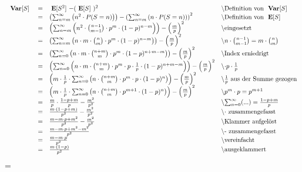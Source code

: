 \documentclass[twoside]{article}
\begin{document}
		\begin{equation*}
		    \begin{array}{rlll}
		        $\var{S}$&=&$\e{S^2}$-($\e{S}$)^2&$\textbackslash Definition von \var{S}$\\
		        &=&\left(\sum_{n=m}^{\infty}\left(n^2\cdot P(S=n)\right)\right)-\left(\sum_{n=m}^{\infty}\left(n\cdot P(S=n)\right)\right)^2&$\textbackslash Definition von \e{S}$\\
		        &=&\left(\sum_{n=m}^{\infty}\left(n^2\cdot\binom{n-1}{m-1}\cdot p^m\cdot (1-p)^{n-m}\right)\right)-\left(\frac{m}{p}\right)^2&$\textbackslash eingesetzt$\\
		        &=&\left(\sum_{n=m}^{\infty}\left(n\cdot m\cdot\binom{n}{m}\cdot p^m\cdot (1-p)^{n-m}\right)\right)-\left(\frac{m}{p}\right)^2&$\textbackslash $n\cdot\binom{n-1}{m-1}=m\cdot\binom{n}{m}\\
		        &=&\left(\sum_{n=0}^{\infty}\left(n\cdot m\cdot\binom{n+m}{m}\cdot p^m\cdot (1-p)^{n+m-m}\right)\right)-\left(\frac{m}{p}\right)^2&$\textbackslash Index erniedrigt$\\
		        &=&\left(\sum_{n=0}^{\infty}\left(n\cdot m\cdot\binom{n+m}{m}\cdot p^m\cdot p\cdot\frac{1}{p}\cdot (1-p)^{n+m-m}\right)\right)-\left(\frac{m}{p}\right)^2&$\textbackslash $\cdot p \cdot\frac{1}{p}\\
		        &=&\left(m\cdot\frac{1}{p}\cdot\sum_{n=0}^{\infty}\left(n\cdot \binom{n+m}{m}\cdot p^m\cdot p\cdot (1-p)^{n}\right)\right)-\left(\frac{m}{p}\right)^2&$\textbackslash $\frac{1}{p}$ aus der Summe gezogen$\\
		        &=&\left(m\cdot\frac{1}{p}\cdot\sum_{n=0}^{\infty}\left(n\cdot \binom{n+m}{m}\cdot p^{m+1}\cdot (1-p)^{n}\right)\right)-\left(\frac{m}{p}\right)^2&$\textbackslash $p^m\cdot p =p^{m+1}\\
		        &=&\frac{m}{p}\cdot\frac{1-p+m}{p}-\frac{m^2}{p^2}&$\textbackslash $\sum_{n=0}^{\infty}(...) = \frac{1-p+m}{p}\\
		        &=&\frac{m\cdot(1-p+m)}{p^2}-\frac{m^2}{p^2}&$\textbackslash $\cdot$ zusammengefasst$\\
		        &=&\frac{m-m\cdot p+m^2}{p^2}-\frac{m^2}{p^2}&$\textbackslash Klammer aufgelöst$\\
		        &=&\frac{m-m\cdot p+m^2-m^2}{p^2}&$\textbackslash - zusammengefasst$\\
		        &=&\frac{m-m\cdot p}{p^2}&$\textbackslash vereinfacht$\\
		        &=&\frac{m\cdot(1-p)}{p^2}&$\textbackslash ausgeklammert$
		    \end{array}
		\end{equation*}
\fi
\ifnum\ZettelElf=\True
{}
\end{document}
